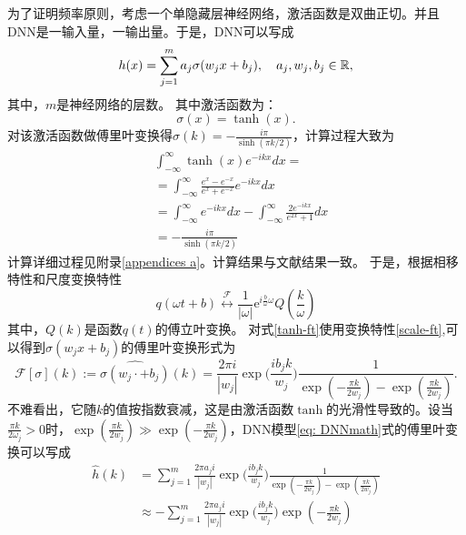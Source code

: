 为了证明频率原则，考虑一个单隐藏层神经网络，激活函数是双曲正切。并且DNN是一输入量，一输出量。于是，DNN可以写成
\begin{equation}
    h(x)=\sum_{j=1}^{m}a_{j}\sigma(w_{j}x+b_{j}),\quad a_{j},w_{j},b_{j}\in{\rm \mathbb{R}},\label{eq: DNNmath}
\end{equation}
其中，$m$是神经网络的层数。
其中激活函数为：
\begin{equation}\label{tanh}
    \sigma(x)=\tanh(x).
\end{equation}
对该激活函数做傅里叶变换得$\hat{\sigma}(k)=-\frac{i\pi}{\sinh(\pi k/2)}$\cite{bracewell1986fourier}，计算过程大致为
\begin{equation}\label{tanh-ft}
    \begin{aligned}
      &  \int_{-\infty }^{\infty } \tanh (x)e^{-ikx}dx= \\
&=\int_{-\infty}^{\infty} \frac{e^{x}-e^{-x}}{e^{x}+e^{-x}} e^{-i kx} d x \\
&=\int_{-\infty }^{\infty } e^{-ikx}dx-\int_{-\infty }^{\infty } \frac{2e^{-ikx}}{e^{2x}+1} dx \\
&=-\frac{i\pi}{\sinh(\pi k/2)}
\end{aligned}
\end{equation}
计算详细过程见附录\ref{appendices a}。计算结果与文献结果一致。
于是，根据相移特性和尺度变换特性\cite{刘树棠2010信号与系统}
\begin{equation}\label{scale-ft}
    q(\omega t+b) \stackrel{\mathcal{F}}{\longleftrightarrow} \frac{1}{|\omega|} \mathrm{e}^{i \frac{b}{\omega} \omega} Q\left(\frac{k}{\omega}\right)
\end{equation}
其中，$Q(k)$是函数$q(t)$的傅立叶变换。
对式\ref{tanh-ft}使用变换特性\ref{scale-ft},可以得到$\sigma(w_{j}x+b_{j})$的傅里叶变换形式为
\begin{equation}
    \mathcal{F}[\sigma](k):=\widehat{\sigma(w_{j}\cdot+b_{j})}(k)=\frac{2\pi i}{|w_{j}|}\exp\Big(\frac{i b_{j}k}{w_{j}}\Big)\frac{1}{\exp(-\frac{\pi k}{2w_{j}})-\exp(\frac{\pi k}{2w_{j}})}.\label{eq:FSigOri}
\end{equation}
不难看出，它随$k$的值按指数衰减，这是由激活函数$\tanh$的光滑性导致的。设当$\frac{\pi k}{2\omega_j}>0$时，$\exp(\frac{\pi k}{2w_{j}})\gg \exp(-\frac{\pi k}{2w_{j}})$，DNN模型\ref{eq: DNNmath}式的傅里叶变换可以写成
\begin{equation}
    \begin{aligned}
        \hat{h}(k)&=\sum_{j=1}^{m}\frac{2\pi a_{j}i}{|w_{j}|}\exp\Big(\frac{i b_{j}k}{w_{j}}\Big)\frac{1}{\exp(-\frac{\pi k}{2w_{j}})-\exp(\frac{\pi k}{2w_{j}})} \\
& \approx -\sum_{j=1}^{m}\frac{2\pi a_{j}i}{|w_{j}|}\exp\Big(\frac{i b_{j}k}{w_{j}}\Big)\exp(-\frac{\pi k}{2w_{j}})
\end{aligned}
\end{equation}
